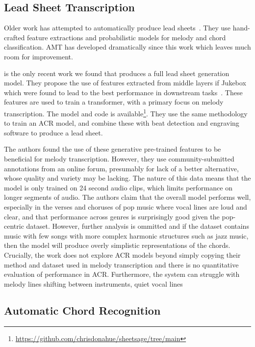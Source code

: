 \subsection{Lead Sheet Transcription}

Older work has attempted to automatically produce lead sheets~\citep{LeadSheet2008,LeadSheet2009}. They use hand-crafted feature extractions and probabilistic models for melody and chord classification. AMT has developed dramatically since this work which leaves much room for improvement.

\citep{MelodyTranscriptionViaGenerativePreTraining} is the only recent work we found that produces a full lead sheet generation model. They propose the use of features extracted from middle layers if Jukebox~\citep{Jukebox} which were found to lead to the best performance in downstream tasks~\citep{JukeBoxFeatureExtraction}. These features are used to train a transformer, with a primary focus on melody transcription. The model and code is available\footnote{\url{https://github.com/chrisdonahue/sheetsage/tree/main}}. They use the same methodology to train an ACR model, and combine these with beat detection and engraving software to produce a lead sheet.

The authors found the use of these generative pre-trained features to be beneficial for melody transcription. However, they use community-submitted annotations from an online forum, presumably for lack of a better alternative, whose quality and variety may be lacking. The nature of this data means that the model is only trained on 24 second audio clips, which limits performance on longer segments of audio. The authors claim that the overall model performs well, especially in the verses and choruses of pop music where vocal lines are loud and clear, and that performance across genres is surprisingly good given the pop-centric dataset. However, further analysis is ommitted and if the dataset contains music with few songs with more complex harmonic structures such as jazz music, then the model will produce overly simplistic representations of the chords. Crucially, the work does not explore ACR models beyond simply copying their method and dataset used in melody transcription and there is no quantitative evaluation of performance in ACR. Furthermore, the system can struggle with melody lines shifting between instruments, quiet vocal lines

\subsection{Automatic Chord Recognition}\label{sec:background-acr}

